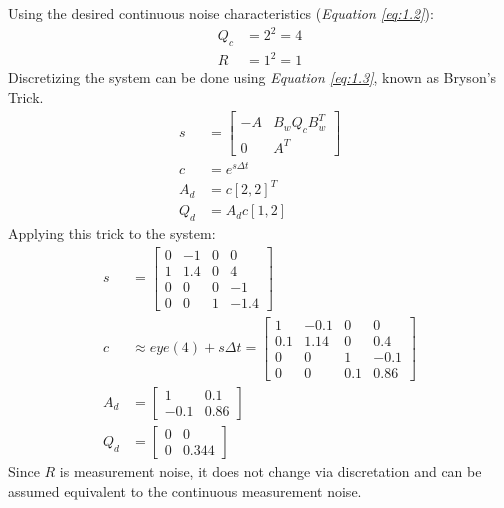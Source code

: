 \documentclass[10pt]{article}
\begin{document}
\begin{enumerate}[label=\textbf{\arabic*.}]
  Using the desired continuous noise characteristics (\emph{Equation 
  \ref{eq:1.2}}):
  \begin{equation}
    \begin{split}
      Q_c &= 2^2 = 4 \\
      R &= 1^2 = 1   
    \end{split}
    \label{eq:1.2}
  \end{equation}
  Discretizing the system can be done using \emph{Equation \ref{eq:1.3}}, 
  known as Bryson's Trick.
  \begin{equation}
    \begin{split}
       s &= \begin{bmatrix} -A & B_w Q_c B_w^T \\ 0 & A^T \end{bmatrix} \\
       c &= e^{s \Delta t} \\
       A_d &= c[2,2]^T \\
       Q_d &= A_d c[1,2]
    \end{split}
    \label{eq:1.3}
  \end{equation}
  Applying this trick to the system:
  \begin{equation*}
    \begin{split}
      s &= \begin{bmatrix} 0 & -1 & 0 & 0 \\ 1 & 1.4 & 0 & 4 \\ 
                           0 & 0 & 0 & -1 \\ 0 & 0 & 1 & -1.4 \end{bmatrix} \\
      c &\approx eye(4) + s \Delta t =
      \begin{bmatrix} 1 & -0.1 & 0 & 0 \\ 0.1 & 1.14 & 0 & 0.4 \\ 
                      0 & 0 & 1 & -0.1 \\ 0 & 0 & 0.1 & 0.86 \end{bmatrix} \\
      A_d &= \begin{bmatrix} 1 & 0.1 \\ -0.1 & 0.86 \end{bmatrix} \\
      Q_d &= \begin{bmatrix} 0 & 0 \\ 0 & 0.344 \end{bmatrix}
    \end{split}
    \label{eq:1.4}
  \end{equation*}
  Since $R$ is measurement noise, it does not change via discretation and can 
  be assumed equivalent to the continuous measurement noise.\\


\end{enumerate}
\end{document}
